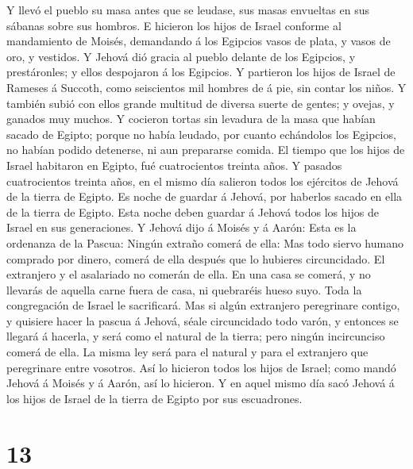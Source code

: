 Y llevó el pueblo su masa antes que se leudase, sus masas
envueltas en sus sábanas sobre sus hombros.  E hicieron los
hijos de Israel conforme al mandamiento de Moisés, demandando á los
Egipcios vasos de plata, y vasos de oro, y vestidos.  Y
Jehová dió gracia al pueblo delante de los Egipcios, y prestáronles; y
ellos despojaron á los Egipcios.  Y partieron los hijos de
Israel de Rameses á Succoth, como seiscientos mil hombres de á pie, sin
contar los niños.  Y también subió con ellos grande
multitud de diversa suerte de gentes; y ovejas, y ganados muy muchos.
 Y cocieron tortas sin levadura de la masa que habían
sacado de Egipto; porque no había leudado, por cuanto echándolos los
Egipcios, no habían podido detenerse, ni aun prepararse comida.
 El tiempo que los hijos de Israel habitaron en Egipto, fué
cuatrocientos treinta años.  Y pasados cuatrocientos
treinta años, en el mismo día salieron todos los ejércitos de Jehová de
la tierra de Egipto.  Es noche de guardar á Jehová, por
haberlos sacado en ella de la tierra de Egipto. Esta noche deben guardar
á Jehová todos los hijos de Israel en sus generaciones.  Y
Jehová dijo á Moisés y á Aarón: Esta es la ordenanza de la Pascua:
Ningún extraño comerá de ella:  Mas todo siervo humano
comprado por dinero, comerá de ella después que lo hubieres
circuncidado.  El extranjero y el asalariado no comerán de
ella.  En una casa se comerá, y no llevarás de aquella
carne fuera de casa, ni quebraréis hueso suyo.  Toda la
congregación de Israel le sacrificará.  Mas si algún
extranjero peregrinare contigo, y quisiere hacer la pascua á Jehová,
séale circuncidado todo varón, y entonces se llegará á hacerla, y será
como el natural de la tierra; pero ningún incircunciso comerá de ella.
 La misma ley será para el natural y para el extranjero que
peregrinare entre vosotros.  Así lo hicieron todos los
hijos de Israel; como mandó Jehová á Moisés y á Aarón, así lo hicieron.
 Y en aquel mismo día sacó Jehová á los hijos de Israel de
la tierra de Egipto por sus escuadrones.

\hypertarget{section-12}{%
\section{13}\label{section-12}}

